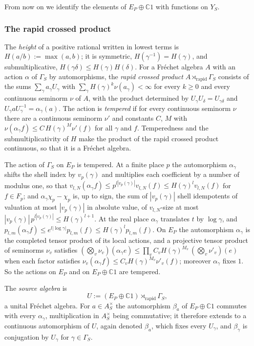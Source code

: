 \documentclass[11pt]{amsart}
\theoremstyle{definition}
\theoremstyle{remark}
\newcommand{\C}{\mathbb C}
\begin{document}
From now on we identify the elements of $E_P\oplus\C1$ with functions on $Y_S$.

\subsubsection*{The rapid crossed product}
The \emph{height} of a positive rational written in lowest terms is
$H(a/b):=\max(a,b)$; it is symmetric, $H(\gamma^{-1})=H(\gamma)$, and
submultiplicative, $H(\gamma\delta)\le H(\gamma)H(\delta)$.  For a Fr\'echet
algebra $A$ with an action $\alpha$ of $\Gamma_S$ by automorphisms, the
\emph{rapid crossed product} $A\rtimes_{\mathrm{rapid}}\Gamma_S$ consists of the
sums $\sum_{\gamma}a_{\gamma}U_{\gamma}$ with
$\sum_{\gamma}H(\gamma)^{k}\nu(a_{\gamma})<\infty$ for every $k\ge0$ and every
continuous seminorm $\nu$ of $A$, with the product determined by
$U_{\gamma}U_{\delta}=U_{\gamma\delta}$ and
$U_{\gamma}aU_{\gamma}^{-1}=\alpha_{\gamma}(a)$.  The action is \emph{tempered}
if for every continuous seminorm $\nu$ there are a continuous seminorm $\nu'$
and constants $C$, $M$ with $\nu(\alpha_{\gamma}f)\le C\,H(\gamma)^{M}\nu'(f)$
for all $\gamma$ and $f$.  Temperedness and the submultiplicativity of $H$
make the product of the rapid crossed product continuous, so that it is a
Fr\'echet algebra.

The action of $\Gamma_S$ on $E_P$ is tempered.  At a finite place $p$ the
automorphism $\alpha_{\gamma}$ shifts the shell index by $v_p(\gamma)$ and
multiplies each coefficient by a number of modulus one, so that
$v_{l,N}(\alpha_{\gamma}f)\le p^{l|v_p(\gamma)|}v_{l,N}(f)\le
H(\gamma)^{l}v_{l,N}(f)$ for $f\in F_p$; and $\alpha_{\gamma}\chi_p-\chi_p$ is,
up to sign, the sum of $|v_p(\gamma)|$ shell idempotents of valuation at most
$|v_p(\gamma)|$ in absolute value, of $v_{l,N}$-size at most
$|v_p(\gamma)|\,p^{l|v_p(\gamma)|}\le H(\gamma)^{l+1}$.  At the real place
$\alpha_{\gamma}$ translates $t$ by $\log\gamma$, and
$p_{l,m}(\alpha_{\gamma}f)\le e^{l|\log\gamma|}p_{l,m}(f)\le
H(\gamma)^{l}p_{l,m}(f)$.  On $E_P$ the automorphism $\alpha_{\gamma}$ is the
completed tensor product of its local actions, and a projective tensor
product of seminorms $\nu_v$ satisfies
$(\bigotimes_v\nu_v)(\alpha_{\gamma}e)\le\prod_vC_vH(\gamma)^{M_v}\,
(\bigotimes_v\nu'_v)(e)$ when each factor satisfies
$\nu_v(\alpha_{\gamma}f)\le C_vH(\gamma)^{M_v}\nu'_v(f)$; moreover
$\alpha_{\gamma}$ fixes $1$.  So the actions on $E_P$ and on $E_P\oplus\C1$
are tempered.

The \emph{source algebra} is
\begin{equation}\label{eq:source}
U:=(E_P\oplus\C 1)\rtimes_{\mathrm{rapid}}\Gamma_S ,
\end{equation}
a unital Fr\'echet algebra.
For $a\in A_S^{\times}$ the automorphism $\beta_a$ of
$E_P\oplus\C1$ commutes with every $\alpha_{\gamma}$, multiplication in
$A_S^{\times}$ being commutative; it therefore extends to a continuous
automorphism of $U$, again denoted $\beta_a$, which fixes every $U_{\gamma}$,
and $\beta_{\gamma}$ is conjugation by $U_{\gamma}$ for
$\gamma\in\Gamma_S$.
\end{document}
